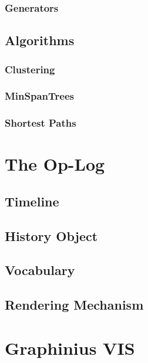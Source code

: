 		\subsubsection{Generators}
		\label{sssection: core_}
		
	
	\subsection{Algorithms}
	\label{ssect:algorithms}
	
		\subsubsection{Clustering}
		\label{sssection: algo_clustering}
		
		\subsubsection{MinSpanTrees}
		\label{sssection: algo_minspan}
		
		\subsubsection{Shortest Paths}
		\label{sssection: algo_shorest_paths}


\section{The Op-Log}
\label{sect:op_log}

	\subsection{Timeline}
	\label{ssect:timeline}
	
	\subsection{History Object}
	\label{ssect:history_object}

	\subsection{Vocabulary}
	\label{ssect:vocabulary}	

	\subsection{Rendering Mechanism}
	\label{ssect:rendering}


\section{Graphinius VIS}
\label{sect:graphinius_vis}

